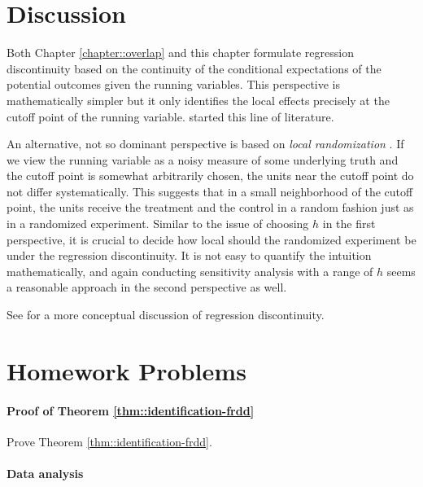  
 
 \section{Discussion}


Both Chapter \ref{chapter::overlap} and this chapter formulate regression discontinuity based on the continuity of the conditional expectations of the potential outcomes given the running variables. This perspective is mathematically simpler but it only identifies the local effects precisely at the cutoff point of the running variable. \citet{hahn2001identification} started this line of literature. 

An alternative, not so dominant perspective is based on {\it local randomization} \citep{cattaneo2015randomization, li2015evaluating}. If we view the running variable as a noisy measure of some underlying truth and the cutoff point is somewhat arbitrarily chosen, the units near the cutoff point do not differ systematically. This suggests that in a small neighborhood of the cutoff point, the units receive the treatment and the control in a random fashion just as in a randomized experiment. Similar to the issue of choosing $h$ in the first perspective, it is crucial to decide how local should the randomized experiment be under the regression discontinuity. It is not easy to quantify the intuition mathematically, and again conducting sensitivity analysis with a range of $h$ seems a reasonable approach in the second perspective as well.  


See \citet{sekhon2017interpreting} for a more conceptual discussion of regression discontinuity. 



 
\section{Homework Problems}

\paragraph{Proof of Theorem \ref{thm::identification-frdd}}\label{para::proof-theorem-frd}

Prove Theorem \ref{thm::identification-frdd}. 


\paragraph{Data analysis}
 
